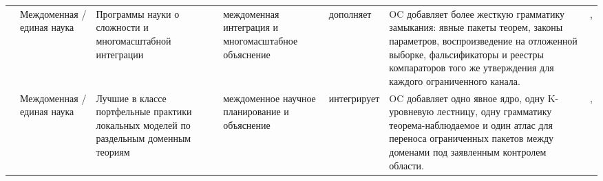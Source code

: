 \begin{longtable}{@{}L{0.14\textwidth}L{0.09\textwidth}L{0.14\textwidth}L{0.12\textwidth}L{0.10\textwidth}L{0.18\textwidth}L{0.15\textwidth}@{}}
 & Междоменная /\allowbreak единая наука & Программы науки о сложности и многомасштабной интеграции & междоменная интеграция и многомасштабное объяснение & дополняет & OC добавляет более жесткую грамматику замыкания: явные пакеты теорем, законы параметров, воспроизведение на отложенной выборке, фальсификаторы и реестры компараторов того же утверждения для каждого ограниченного канала. & , \allowbreak {} \\
 & Междоменная /\allowbreak единая наука & Лучшие в классе портфельные практики локальных моделей по раздельным доменным теориям & междоменное научное планирование и объяснение & интегрирует & OC добавляет одно явное ядро, одну K-уровневую лестницу, одну грамматику теорема-наблюдаемое и один атлас для переноса ограниченных пакетов между доменами под заявленным контролем области. & , \allowbreak {} \\
\bottomrule
\end{longtable}
\endgroup

